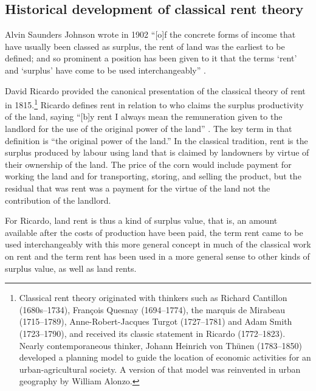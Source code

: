 \subsection{Historical development of classical rent theory}
Alvin Saunders Johnson wrote in 1902 ``[o]f the concrete forms of income that have usually been classed as surplus, the rent of land was the earliest to be defined; and so prominent a position has been given to it that the terms `rent' and `surplus' have come to be used interchangeably'' \cite{johnsonRentModernEconomic1902}. 

David Ricardo provided the canonical presentation of the classical theory of rent \cite{ricardoEssayInfluenceLow1815} in 1815.\footnote{Classical rent theory originated with thinkers such as Richard Cantillon (1680s--1734), Fran\c{c}ois Quesnay (1694--1774), the marquis de Mirabeau (1715--1789), Anne-Robert-Jacques Turgot (1727--1781) and Adam Smith (1723--1790), and received its classic statement in Ricardo (1772--1823). Nearly contemporaneous thinker, Johann Heinrich von Th\"unen (1783--1850) developed a planning model to guide the location of economic activities for an urban-agricultural society. A version of that model was reinvented in urban geography by William Alonzo.} 
 Ricardo defines rent in relation to who claims the surplus productivity of the land, %
saying ``[b]y rent I always mean the remuneration given to the landlord for the use of the original power of the land'' \cite{ricardoEssayInfluenceLow1815}. The key term in that definition is ``the original power of the land.'' In the classical tradition, rent is the surplus produced by labour using land that is claimed by landowners by virtue of their ownership of the land. The price of the corn would include payment for working the land and for transporting, storing, and selling the product, but the residual that was rent was  a payment for the virtue of the land not the contribution of the landlord. 

For Ricardo, %
\gls{land rent} is thus a kind of \gls{surplus value}, that is, an amount available after the costs of production have been paid, the term rent came to be used interchangeably with this more general concept in much of the classical work on rent and the term rent has been used in a more general sense to other kinds of surplus value, as well as land rents. %




